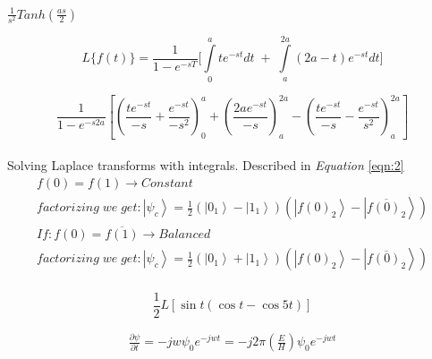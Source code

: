 \documentclass{article}
\begin{document}
	
	$\frac{1} {s^2} Tanh(\frac{{as}}{2}) $
	
	\begin{equation}
		L\{ f(t)\}  = \frac{1}{{1 - {e^{ - sT}}}}[\int\limits_0^a {t{e^{ - st}}dt\; + \;\int\limits_a^{2a} {(2a - t){e^{ - st}}dt]} }	
	\end{equation}
	
	
	\begin{equation}\label{eqn:2}
		\frac{1}{{1 - {e^{ - s2a}}}}[(\frac{{t{e^{ - st}}}}{{ - s}} + \frac{{{e^{ - st}}}}{{ - {s^2}}})_0^a + (\frac{{2a{e^{ - st}}}}{{ - s}})_a^{2a} - (\frac{{t{e^{ - st}}}}{{ - s}} - \frac{{{e^{ - st}}}}{{{s^2}}})_a^{2a}]		
	\end{equation}
	\\
	
	Solving Laplace transforms with integrals. Described in \textit{Equation} \ref{eqn:2}\\
	
	\begin{equation}\label{eqn:3}
		\begin{array}{l}
			f(0) = f(1) \to Constant\\
			factorizing{{ }}\;we\;{{get : }}\left| {{\psi _c}} \right\rangle  = \frac{1}{2}\left( {\left| {{0_1}} \right\rangle  - \left| {{1_1}} \right\rangle } \right)\left( {\left| {f{{(0)}_2}} \right\rangle  - \left| {\overline {f{{(0)}_2}} } \right\rangle } \right)\\
			If{{ : }}f(0) = \overline {f(1)}  \to Balanced\\
			factorizing{{ }}\;we\;{{get : }}\left| {{\psi _c}} \right\rangle  = \frac{1}{2}\left( {\left| {{0_1}} \right\rangle  + \left| {{1_1}} \right\rangle } \right)\left( {\left| {f{{(0)}_2}} \right\rangle  - \left| {\overline {f{{(0)}_2}} } \right\rangle } \right)
		\end{array}
	\end{equation}
	\\
	
	\begin{equation}\label{eqn:4}
		\frac{1}{2}L[\sin t(\cos t - \cos 5t)]
	\end{equation}

	\begin{eqnarray} \label{eqn:5}
		\frac{{\partial \psi }}{{\partial t}} =  - jw{\psi _0}{e^{ - jwt}} =  - j2\pi \left( {\frac{E}{H}} \right){\psi _0}{e^{ - jwt}}
	\end{eqnarray}
	
\end{document}
